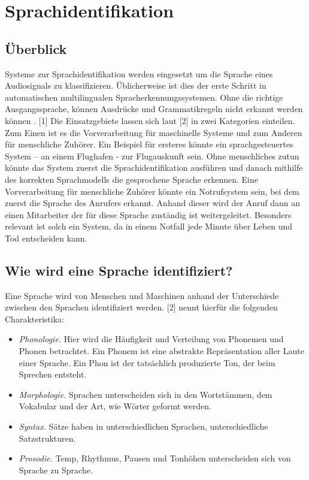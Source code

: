 \section{Sprachidentifikation}
\subsection{Überblick}
Systeme zur Sprachidentifikation werden eingesetzt um die Sprache eines Audiosignals zu klassifizieren. Üblicherweise ist dies der erste Schritt in automatischen multilingualen Spracherkennungssystemen.
Ohne die richtige Ausgangssprache, können Ausdrücke und Grammatikregeln nicht erkannt werden können \cite{Bartz.2017}.  [1]
Die Einsatzgebiete lassen sich laut [2] in zwei Kategorien einteilen. Zum Einen ist es die Vorverarbeitung für maschinelle Systeme und zum Anderen für menschliche Zuhörer. Ein Beispiel für ersteres könnte ein sprachgesteuertes System – an einem Flughafen - zur Flugauskunft sein. Ohne menschliches zutun könnte das System zuerst die Sprachidentifikation ausführen und danach mithilfe des korrekten Sprachmodells die gesprochene Sprache erkennen.
Eine Vorverarbeitung für menschliche Zuhörer könnte ein Notrufsystem sein, bei dem zuerst die Sprache des Anrufers erkannt. Anhand dieser wird der Anruf dann an einen Mitarbeiter der für diese Sprache zuständig ist weitergeleitet. Besonders relevant ist solch ein System, da in einem Notfall jede Minute über Leben und Tod entscheiden kann.

\subsection{Wie wird eine Sprache identifiziert?}
Eine Sprache wird von Menschen und Maschinen anhand der Unterschiede zwischen den Sprachen identifiziert werden. [2] nennt hierfür die folgenden Charakteristika:
\begin{itemize}
\item \textit{Phonologie.} Hier wird die Häufigkeit und Verteilung von Phonemen und Phonen betrachtet. Ein Phonem ist eine abstrakte Repräsentation aller Laute einer Sprache. Ein Phon ist der tatsächlich produzierte Ton, der beim Sprechen entsteht.
\item \textit{Morphologie.} Sprachen unterscheiden sich in den Wortstämmen, dem Vokabular und der Art, wie Wörter geformt werden.
\item \textit{Syntax.} Sätze haben in unterschiedlichen Sprachen, unterschiedliche Satzstrukturen.
\item \textit{Prosodie.} Temp, Rhythmus, Pausen und Tonhöhen unterscheiden sich von Sprache zu Sprache.
\end{itemize}

